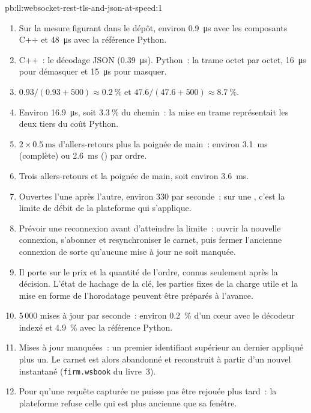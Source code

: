 \begin{solution}{pb:ll:websocket-rest-tls-and-json-at-speed:1}
\begin{enumerate}
\item Sur la mesure figurant dans le dépôt, environ \qty{0.9}{\micro\second} avec les composants C++ et \qty{48}{\micro\second} avec la
référence Python.
\item C++~: le décodage JSON (\qty{0.39}{\micro\second}). Python~: la trame octet par octet, \qty{16}{\micro\second} pour démasquer
et \qty{15}{\micro\second} pour masquer.
\item $0.93/(0.93 + 500) \approx 0.2~\%$ et $47.6/(47.6 + 500) \approx 8.7~\%$.
\item Environ \qty{16.9}{\micro\second}, soit $3.3~\%$ du chemin~: la mise en trame représentait les deux tiers du coût Python.
\item $2 \times \qty{0.5}{\milli\second}$ d'allers-retours plus la poignée de main~: environ \qty{3.1}{\milli\second} (complète) ou
\qty{2.6}{\milli\second} () par ordre.
\item Trois allers-retours et la poignée de main, soit environ \qty{3.6}{\milli\second}.
\item Ouvertes l'une après l'autre, environ 330 par seconde~; sur une , c'est la limite de débit de la plateforme qui s'applique.
\item Prévoir une reconnexion avant d'atteindre la limite~: ouvrir la nouvelle connexion, s'abonner et resynchroniser le carnet, puis fermer l'ancienne connexion
de sorte qu'aucune mise à jour ne soit manquée.
\item Il porte sur le prix et la quantité de l'ordre, connus seulement après la décision. L'état de hachage de la clé, les parties fixes de la
charge utile et la mise en forme de l'horodatage peuvent être préparés à l'avance.
\item 5\,000 mises à jour par seconde~: environ 0.2~\% d'un cœur avec le décodeur indexé et 4.9~\% avec la référence Python.
\item Mises à jour manquées~: un premier identifiant supérieur au dernier appliqué plus un. Le carnet est alors abandonné et reconstruit à partir d'un
nouvel instantané (\texttt{firm.wsbook} du livre~3).
\item Pour qu'une requête capturée ne puisse pas être rejouée plus tard~: la plateforme refuse celle qui est plus ancienne que sa fenêtre.

\end{enumerate}
\end{solution}
